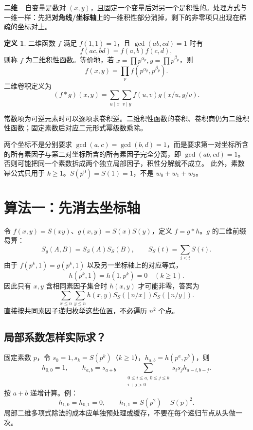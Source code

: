 \documentclass[UTF8,a4paper,11pt,twoside,openright,fontset=fandol]{ctexbook}
\theoremstyle{definition}
\newtheorem{definition}{定义}[chapter]
\newcommand{\floor}[1]{\left\lfloor #1\right\rfloor}
\begin{document}
\begin{tip}[词义：二维积性]
\textbf{二维}= 自变量是数对 $(x,y)$，且固定一个变量后对另一个是积性的。处理方式与一维一样：先把\textbf{对角线/坐标轴}上的一维积性部分消掉，剩下的非零项只出现在稀疏的坐标对上。
\end{tip}

\begin{definition}
二维函数 $f$ 满足 $f(1,1)=1$，且 $\gcd(ab,cd)=1$ 时有
\[
 f(ac,bd)=f(a,b)f(c,d),
\]
则称 $f$ 为二维积性函数。等价地，若 $x=\prod p^{\alpha_p},y=\prod p^{\beta_p}$，则
\[
 f(x,y)=\prod_p f(p^{\alpha_p},p^{\beta_p}).
\]
二维卷积定义为
\[
 (f*g)(x,y)=\sum_{u\mid x}\sum_{v\mid y}f(u,v)g(x/u,y/v).
\]
\end{definition}
常数项为可逆元素时可以逐项求卷积逆。二维积性函数的卷积、卷积商仍为二维积性函数；固定素数后对应二元形式幂级数乘除。


\begin{teach}[从一维过渡时必须补上的条件]
两个坐标不是分别要求 $\gcd(a,c)=\gcd(b,d)=1$，而是要求第一对坐标所含的所有素因子与第二对坐标所含的所有素因子完全分离，即 $\gcd(ab,cd)=1$。否则可能把同一个素数拆成两个独立局部因子，积性分解就不成立。
此外，素数幂公式只用于 $k\ge1$。$S(p^0)=S(1)=1$，不是 $w_0+w_1+w_2$。
\end{teach}


\section{算法一：先消去坐标轴}
令 $f(x,y)=S(xy)$、$g(x,y)=S(x)S(y)$，定义 $f=g*h$。$g$ 的二维前缀易算：
\[
 S_g(A,B)=S_S(A)S_S(B),\qquad S_S(t)=\sum_{i\le t}S(i).
\]
由于 $f(p^k,1)=g(p^k,1)$ 以及另一坐标轴上的对应等式，
\[
 h(p^k,1)=h(1,p^k)=0\quad(k\ge1).
\]
因此只有 $x,y$ 含相同素因子集合时 $h(x,y)$ 才可能非零，答案为
\[
 \sum_{x\le n}\sum_{y\le n}h(x,y)
 S_S(\floor{n/x})S_S(\floor{n/y}).
\]
直接按共同素因子递归枚举这些位置，不必遍历 $n^2$ 个点。


\subsection{局部系数怎样实际求？}
固定素数 $p$，令 $s_0=1,s_k=S(p^k)$（$k\ge1$），$h_{a,b}=h(p^a,p^b)$，则
\[
 h_{0,0}=1,\qquad
 h_{a,b}=s_{a+b}-\sum_{\substack{0\le i\le a,\,0\le j\le b\\i+j>0}}
 s_i s_j h_{a-i,b-j}.
\]
按 $a+b$ 递增计算。例：
\[
 h_{1,0}=h_{0,1}=0,\qquad h_{1,1}=S(p^2)-S(p)^2.
\]
局部二维多项式除法的成本应单独预处理或缓存，不要在每个递归节点从头做一次。
\end{document}
